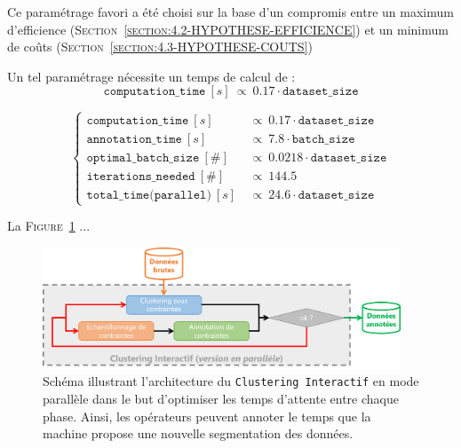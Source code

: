 		Ce paramétrage favori a été choisi sur la base d'un compromis entre un maximum d'efficience (\textsc{Section~\ref{section:4.2-HYPOTHESE-EFFICIENCE}}) et un minimum de coûts (\textsc{Section~\ref{section:4.3-HYPOTHESE-COUTS}})
			
		Un tel paramétrage nécessite un temps de calcul de :
		\begin{equation}
			\label{equation:5.4-GUIDE-PARAMETRAGES-ET-COUTS-TEMPS-CALCUL}
			\texttt{computation\_time}~[s]~\propto~0.17 \cdot \texttt{dataset\_size}
		\end{equation}
			
		
		
		\begin{equation}
			\label{equation:5.4-GUIDE-PARAMETRAGES-ET-COUTS-TEMPS-UNE-ITERATION-PARALLELE}
			\begin{cases}
				\texttt{computation\_time}~[s]&
					~\propto~0.17 \cdot \texttt{dataset\_size}\\
				\texttt{annotation\_time}~[s]&
					~\propto~7.8 \cdot \texttt{batch\_size} \\
				\texttt{optimal\_batch\_size}~[\#]&
					~\propto~0.0218 \cdot \texttt{dataset\_size} \\
				\texttt{iterations\_needed}~[\#] &
					~\propto~144.5 \\
				\texttt{total\_time(parallel)}~[s] &
						~\propto~24.6 \cdot \texttt{dataset\_size}
			\end{cases}
		\end{equation}
		
		
		
		\begin{leftBarImportantGreen}
			La \textsc{Figure~\ref{figure:5.4-GUIDE-PARAMETRAGES-ET-COUTS-ARCHITECTURE-PARALLELE}} ...
			
			\begin{figure}[H]
				\centering
				\includegraphics[width=0.95\textwidth]{figures/interactive-clustering-architecture-parallele}
				\caption{
					Schéma illustrant l'architecture du \texttt{Clustering Interactif} en mode parallèle dans le but d'optimiser les temps d'attente entre chaque phase.
					Ainsi, les opérateurs peuvent annoter le temps que la machine propose une nouvelle segmentation des données.
				}
				\label{figure:5.4-GUIDE-PARAMETRAGES-ET-COUTS-ARCHITECTURE-PARALLELE}
			\end{figure}
		\end{leftBarImportantGreen}
		
